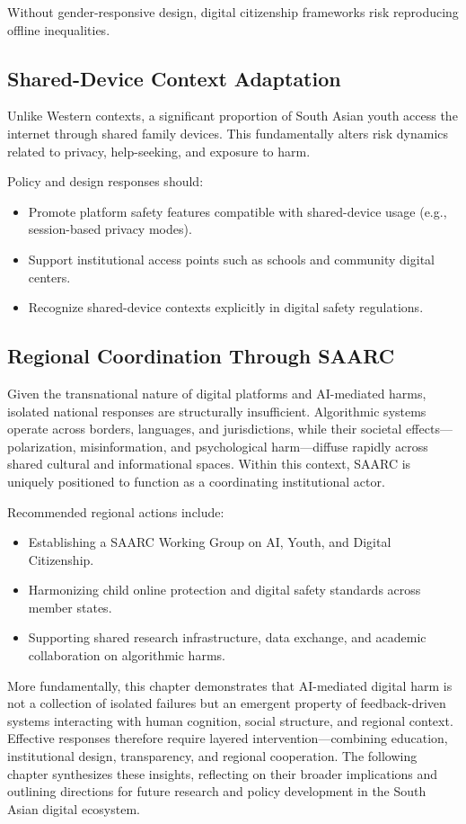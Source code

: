 \documentclass[12pt,a4paper]{report}
\begin{document}
Without gender-responsive design, digital citizenship frameworks risk reproducing offline inequalities.

\subsection{Shared-Device Context Adaptation}

Unlike Western contexts, a significant proportion of South Asian youth access the internet through shared family devices. This fundamentally alters risk dynamics related to privacy, help-seeking, and exposure to harm.

Policy and design responses should:
\begin{itemize}
  \item Promote platform safety features compatible with shared-device usage (e.g., session-based privacy modes).
  \item Support institutional access points such as schools and community digital centers.
  \item Recognize shared-device contexts explicitly in digital safety regulations.
\end{itemize}

\subsection{Regional Coordination Through SAARC}

Given the transnational nature of digital platforms and AI-mediated harms, isolated national responses are structurally insufficient. Algorithmic systems operate across borders, languages, and jurisdictions, while their societal effects—polarization, misinformation, and psychological harm—diffuse rapidly across shared cultural and informational spaces. Within this context, SAARC is uniquely positioned to function as a coordinating institutional actor.

Recommended regional actions include:
\begin{itemize}
  \item Establishing a SAARC Working Group on AI, Youth, and Digital Citizenship.
  \item Harmonizing child online protection and digital safety standards across member states.
  \item Supporting shared research infrastructure, data exchange, and academic collaboration on algorithmic harms.
\end{itemize}

More fundamentally, this chapter demonstrates that AI-mediated digital harm is not a collection of isolated failures but an emergent property of feedback-driven systems interacting with human cognition, social structure, and regional context. Effective responses therefore require layered intervention—combining education, institutional design, transparency, and regional cooperation. The following chapter synthesizes these insights, reflecting on their broader implications and outlining directions for future research and policy development in the South Asian digital ecosystem.
\end{document}
